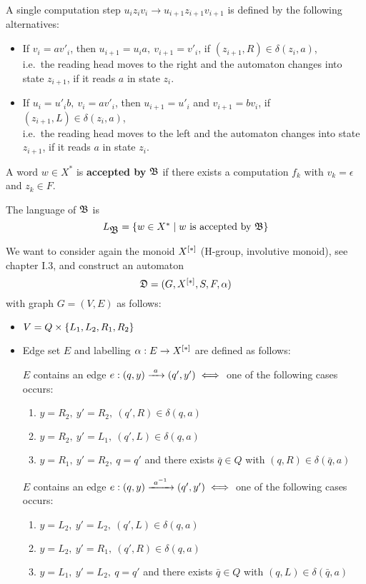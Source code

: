A single computation step $u_i z_i v_i \to u_{i+1} z_{i+1} v_{i+1}$ is defined
by the following alternatives:

\begin{itemize}
  \item If $v_i = a v'_i$, then $u_{i+1} = u_i a,\ v_{i+1} =
  v'_i$, if $(z_{i+1}, R) \in \delta(z_i, a)$,\\
  i.e.\ the reading head moves to the right and the automaton changes into state
  $z_{i+1}$, if it reads $a$ in state $z_i$.

	\item If $u_i = u'_i b,\ v_i = a v'_i$, then $u_{i+1} = u'_i$ and
	$v_{i+1} = b v_i$, if $(z_{i+1}, L) \in \delta(z_i, a)$,\\
	i.e.\ the reading head moves to the left and the automaton changes into state
	$z_{i+1}$, if it reads $a$ in state $z_i$.
\end{itemize}

\bigskip
\begin{definition}
A word $w \in X^*$ is {\bf accepted by} $\mbox{$\mathfrak{B}$}$ if there exists a computation
$f_k$ with $v_k = \epsilon$ and $z_k \in F$.
\end{definition}

The language of $\mbox{$\mathfrak{B}$}$ is
\[ L_{\mbox{$\mathfrak{B}$}} = \mbox{$\{w \in X^* \mid w\text{ is accepted by }\mbox{$\mathfrak{B}$}\}$} \]

\bigskip
We want to consider again the monoid $\mbox{${X}^{[*]}$}$ (H-group, involutive monoid),
see chapter I.3, and construct an automaton 
\[ \mbox{$\mathfrak{D}$} = (G, \mbox{${X}^{[*]}$}, S, F, \alpha) \]
with graph $G=(V, E)$ as follows:
\begin{itemize}
  \item $V = Q \times \mbox{$\{L_1, L_2, R_1, R_2\}$}$
  
  \item Edge set $E$ and labelling $\alpha: E \to \mbox{${X}^{[*]}$}$ are defined as
  follows:
  
  $E$ contains an edge $e: (q, y) \xrightarrow{\ {a}\ } (q', y') \iff$ one of the following
  cases occurs:
  \begin{enumerate}
    \item $y = R_2,\ y' = R_2,\ (q', R) \in \delta(q, a)$
    \item $y = R_2,\ y' = L_1,\ (q', L) \in \delta(q, a)$
    \item $y = R_1,\ y' = R_2,\ q = q'$ and there exists $\bar{q} \in Q$ with
    $(q, R) \in \delta(\bar{q}, a)$
  \end{enumerate}

  $E$ contains an edge $e: (q, y) \xrightarrow{\ {{{a}^{-1}}}\ } (q', y') \iff$ one of the
  following cases occurs:
  \begin{enumerate}
    \item $y = L_2,\ y' = L_2,\ (q', L) \in \delta(q, a)$
    \item $y = L_2,\ y' = R_1,\ (q', R) \in \delta(q, a)$
    \item $y = L_1,\ y' = L_2,\ q = q'$ and there exists $\bar{q} \in Q$ with
    $(q, L) \in \delta(\bar{q}, a)$
  \end{enumerate}
\end{itemize}

